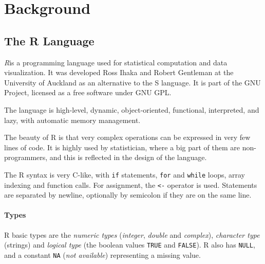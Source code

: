 \chapter{Background}

\begin{chapterabstract}
	\todoadd
\end{chapterabstract}

\section{The R Language}

\textit{R}\todocite is a programming language used for statistical computation and data visualization. It was developed Ross Ihaka and Robert Gentleman at the University of Auckland as an alternative to the S language\todocite. It is part of the GNU Project, licensed as a free software under GNU GPL.

The language is high-level, dynamic, object-oriented, functional, interpreted, and lazy, with automatic memory management.

The beauty of R is that very complex operations can be expressed in very few lines of code.  It is highly used by statistician, where a big part of them are non-programmers, and this is reflected in the design of the language.

The R syntax is very C-like, with \texttt{if} statements, \texttt{for} and \texttt{while} loops, array indexing and function calls. For assignment, the \texttt{<-} operator is used. Statements are separated by newline, optionally by semicolon if they are on the same line.

\subsubsection*{Types}

R basic types are the \textit{numeric types} (\textit{integer}, \textit{double} and \textit{complex}), \textit{character type} (strings) and \textit{logical type} (the boolean values \texttt{TRUE} and \texttt{FALSE}). R also has \texttt{NULL}, and a constant \texttt{NA} (\textit{not available}) representing a missing value.

